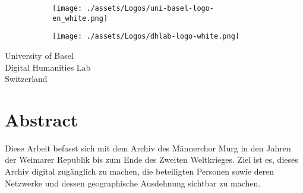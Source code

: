 \documentclass[
  12pt,
  a4paper,
]{article}
\begin{document}
\begin{center}
    \vfill
    \begin{figure}
        \centering
        \begin{subfigure}{.3\textwidth}
          \centering
          \texttt{[image: ./assets/Logos/uni-basel-logo-en\_white.png]}
        \end{subfigure}%
        \begin{subfigure}{.3\textwidth}
          \centering
          \texttt{[image: ./assets/Logos/dhlab-logo-white.png]}
        \end{subfigure}
        \end{figure}
        \setcounter{figure}{0}

    University of Basel\\
    Digital Humanities Lab\\
    Switzerland
\end{center}

\pagecolor{\nopagecolor}
\newpage
{}
\color{black}           %
\thispagestyle{empty}






\section*{Abstract}

Diese Arbeit befasst sich mit dem Archiv des Männerchor Murg in den Jahren der Weimarer Republik bis zum Ende des Zweiten Weltkrieges. Ziel ist es, dieses Archiv digital zugänglich zu machen, die beteiligten Personen sowie deren Netzwerke und dessen geographische Ausdehnung sichtbar zu machen.





\end{document}
